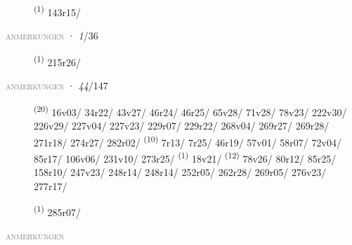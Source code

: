 \begin{description}
    \item[]  \textsuperscript{(1)} \mbox{143r15/}
\end{description}
\textsc{\textcolor{gray}{anmerkungen}}
\ENTRYEND
\noindent{} · \textit{1}/36 \LEMMALINE
\begin{description}
    \item[]  \textsuperscript{(1)} \mbox{215r26/}
\end{description}
\textsc{\textcolor{gray}{anmerkungen}}
\ENTRYEND
\noindent{} · \textit{44}/147 \LEMMALINE
\begin{description}
    \item[]  \textsuperscript{(20)} \mbox{16v03/} \mbox{34r22/} \mbox{43v27/} \mbox{46r24/} \mbox{46r25/} \mbox{65v28/} \mbox{71v28/} \mbox{78v23/} \mbox{222v30/} \mbox{226v29/} \mbox{227v04/} \mbox{227v23/} \mbox{229r07/} \mbox{229r22/} \mbox{268v04/} \mbox{269r27/} \mbox{269r28/} \mbox{271r18/} \mbox{274r27/} \mbox{282r02/} \CASEBREAK {} \textsuperscript{(10)} \mbox{7r13/} \mbox{7r25/} \mbox{46r19/} \mbox{57v01/} \mbox{58r07/} \mbox{72v04/} \mbox{85r17/} \mbox{106v06/} \mbox{231v10/} \mbox{273r25/} \CASEBREAK {} \textsuperscript{(1)} \mbox{18v21/} \textsuperscript{(12)} \mbox{78v26/} \mbox{80r12/} \mbox{85r25/} \mbox{158r10/} \mbox{247v23/} \mbox{248r14/} \mbox{248r14/} \mbox{252r05/} \mbox{262r28/} \mbox{269r05/} \mbox{276v23/} \mbox{277r17/}
    \item[]  \textsuperscript{(1)} \mbox{285r07/}
\end{description}
\textsc{\textcolor{gray}{anmerkungen}}
\ENTRYEND
